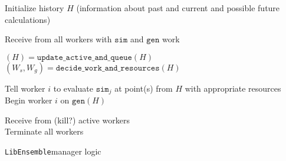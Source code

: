 \documentclass{article}
\newcommand{\libE}{\texttt{LibEnsemble}}
\begin{document}
\newpage
\LinesNumbered
\begin{algorithm}[t] %
  Initialize history $H$ (information about past and current and possible future calculations)\\

  {
    {
      Receive from all workers with $\mathtt{sim}$ and $\mathtt{gen}$ work\\
    }

    $(H) = \mathtt{update\_active\_and\_queue}(H)$
    $(W_s, W_g) = \mathtt{decide\_work\_and\_resources}(H)$

    {
      {
      Tell worker $i$ to evaluate $\mathtt{sim}_j$ at point(s) from $H$ with appropriate resources
      }{
      Begin worker $i$ on $\mathtt{gen}(H)$\\
      }
    }
  }
  Receive from (kill?) active workers\\ 
  Terminate all workers
  \caption{\libE manager logic \label{alg:manager}} 
\end{algorithm}
\end{document}
